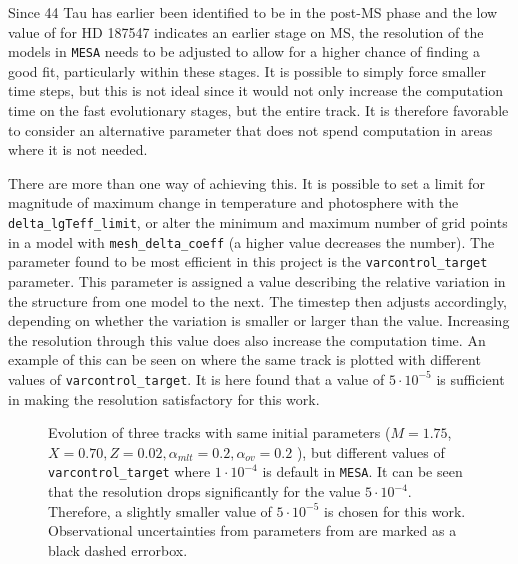 Since 44 Tau has earlier been identified to be in the post-MS phase and the low value of \lum for HD 187547 indicates an earlier stage on MS, the resolution of the models in \texttt{MESA} needs to be adjusted to allow for a higher chance of finding a good fit, particularly within these stages. It is possible to simply force smaller time steps, but this is not ideal since it would not only increase the computation time on the fast evolutionary stages, but the entire track. It is therefore favorable to consider an alternative parameter that does not spend computation in areas where it is not needed. 

There are more than one way of achieving this. It is possible to set a limit for magnitude of maximum change in temperature and photosphere with the \texttt{delta\_lgTeff\_limit}, or alter the minimum and maximum number of grid points in a model with \texttt{mesh\_delta\_coeff} (a higher value decreases the number). The parameter found to be most efficient in this project is the \texttt{varcontrol\_target} parameter. This parameter is assigned a value describing the relative variation in the structure from one model to the next. The timestep then adjusts accordingly, depending on whether the variation is smaller or larger than the value. Increasing the resolution through this value does also increase the computation time. An example of this can be seen on  where the same track is plotted with different values of \texttt{varcontrol\_target}. It is here found that a value of $5\cdot10^{-5}$ is sufficient in making the resolution satisfactory for this work. 

\begin{figure}[htbp]
    \centering
    \caption{Evolution of three tracks with same initial parameters ($M= 1.75$\msun,$X=0.70, Z=0.02, \alpha_{mlt} = 0.2, \alpha_{ov} = 0.2$ ), but different values of \texttt{varcontrol\_target} where $1\cdot10^{-4}$ is default in \texttt{MESA}. It can be seen that the resolution drops significantly for the value $5\cdot10^{-4}$. Therefore, a slightly smaller value of $5\cdot10^{-5}$ is chosen for this work. Observational uncertainties from parameters from \citet{lenz2010delta} are marked as a black dashed errorbox. }
    \label{varcontrol}
\end{figure}


